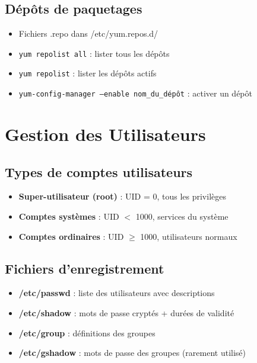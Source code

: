 \documentclass[12pt,a4paper]{article}
\begin{document}
\subsection{D\'ep\^ots de paquetages}
\begin{itemize}
    \item Fichiers .repo dans /etc/yum.repos.d/
    \item \texttt{yum repolist all} : lister tous les d\'ep\^ots
    \item \texttt{yum repolist} : lister les d\'ep\^ots actifs
    \item \texttt{yum-config-manager --enable nom\_du\_d\'ep\^ot} : activer un d\'ep\^ot
\end{itemize}


\section{Gestion des Utilisateurs}


\subsection{Types de comptes utilisateurs}
\begin{itemize}
    \item \textbf{Super-utilisateur (root)} : UID = 0, tous les privil\`eges
    \item \textbf{Comptes syst\`emes} : UID $<$ 1000, services du syst\`eme
    \item \textbf{Comptes ordinaires} : UID $\geq$ 1000, utilisateurs normaux
\end{itemize}

\subsection{Fichiers d'enregistrement}
\begin{itemize}
    \item \textbf{/etc/passwd} : liste des utilisateurs avec descriptions
    \item \textbf{/etc/shadow} : mots de passe crypt\'es + dur\'ees de validit\'e
    \item \textbf{/etc/group} : d\'efinitions des groupes
    \item \textbf{/etc/gshadow} : mots de passe des groupes (rarement utilis\'e)
\end{itemize}
\end{document}
